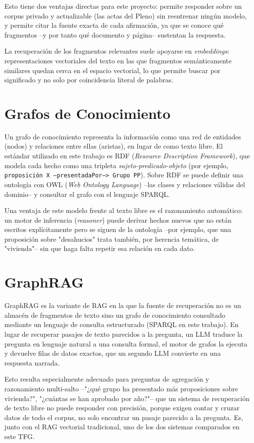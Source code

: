 Esto tiene dos ventajas directas para este proyecto: permite responder sobre un
corpus privado y actualizable (las actas del Pleno) sin reentrenar ningún modelo,
y permite citar la fuente exacta de cada afirmación, ya que se conoce qué
fragmentos --y por tanto qué documento y página-- sustentan la respuesta.

La recuperación de los fragmentos relevantes suele apoyarse en \textit{embeddings}:
representaciones vectoriales del texto en las que fragmentos semánticamente
similares quedan cerca en el espacio vectorial, lo que permite buscar por
significado y no solo por coincidencia literal de palabras.

\section{Grafos de Conocimiento}

Un grafo de conocimiento representa la información como una red de entidades
(nodos) y relaciones entre ellas (aristas), en lugar de como texto libre. El
estándar utilizado en este trabajo es RDF (\textit{Resource Description
Framework}), que modela cada hecho como una tripleta \textit{sujeto-predicado-objeto}
(por ejemplo, \texttt{proposición~X --presentadaPor--> Grupo~PP}). Sobre RDF se
puede definir una ontología con OWL (\textit{Web Ontology Language}) --las clases y
relaciones válidas del dominio-- y consultar el grafo con el lenguaje SPARQL.

Una ventaja de este modelo frente al texto libre es el razonamiento automático: un
motor de inferencia (\textit{reasoner}) puede derivar hechos nuevos que no están
escritos explícitamente pero se siguen de la ontología --por ejemplo, que una
proposición sobre "desahucios" trata también, por herencia temática, de
"vivienda"-- sin que haga falta repetir esa relación en cada dato.

\section{GraphRAG}

GraphRAG es la variante de RAG en la que la fuente de recuperación no es un
almacén de fragmentos de texto sino un grafo de conocimiento consultado mediante
un lenguaje de consulta estructurado (SPARQL en este trabajo). En lugar de
recuperar pasajes de texto parecidos a la pregunta, un LLM traduce la pregunta en
lenguaje natural a una consulta formal, el motor de grafos la ejecuta y devuelve
filas de datos exactos, que un segundo LLM convierte en una respuesta narrada.

Esto resulta especialmente adecuado para preguntas de agregación y razonamiento
multi-salto --"¿qué grupo ha presentado más proposiciones sobre vivienda?",
"¿cuántas se han aprobado por año?"-- que un sistema de recuperación de texto
libre no puede responder con precisión, porque exigen contar y cruzar datos de
todo el corpus, no solo encontrar un pasaje parecido a la pregunta. Es, junto con
el RAG vectorial tradicional, uno de los dos sistemas comparados en este TFG.
